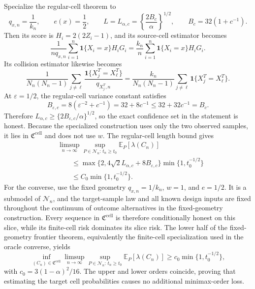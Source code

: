 Specialize the regular-cell theorem to
\[
 q_{x,n}=\frac1{k_n},
 \qquad e(x)=\frac12,
 \qquad
 L=L_{\alpha,c}=\left\{\frac{2B_c}{\alpha}\right\}^{1/2},
 \qquad B_c=32(1+c^{-1}).
\]
Then its score is \(H_i=2(2Z_i-1)\), and its source-cell estimator becomes
\[
 \frac1{nq_{x,n}}\sum_{i=1}^n\mathbf 1\{X_i=x\}H_iG_i
 =\frac{k_n}{n}\sum_{i=1}^n\mathbf 1\{X_i=x\}H_iG_i.
\]
Its collision estimator likewise becomes
\[
 \frac1{N_n(N_n-1)}\sum_{j\ne\ell}
 \frac{\mathbf 1\{X_j^T=X_\ell^T\}}{q_{X_j^T,n}}
 =\frac{k_n}{N_n(N_n-1)}\sum_{j\ne\ell}
 \mathbf 1\{X_j^T=X_\ell^T\}.
\]
At \(\varepsilon=1/2\), the regular-cell variance constant satisfies
\[
 B_{\varepsilon,c}=8(\varepsilon^{-2}+c^{-1})
 =32+8c^{-1}
 \le32+32c^{-1}=B_c.
\]
Therefore \(L_{\alpha,c}\ge\{2B_{\varepsilon,c}/\alpha\}^{1/2}\), so the exact confidence set in the statement is honest. Because the specialized construction uses only the two observed samples, it lies in \(\mathfrak C^{\mathrm{cell}}\) and does not use \(w\). The regular-cell length bound gives
\[
 \begin{aligned}
 &\limsup_{n\to\infty}
 \sup_{P\in\mathcal N_n:\,t_n\ge t_0}
 \mathbb E_P[\lambda(C_n)]\\
 &\qquad\le
 \max\{2,4\sqrt2L_{\alpha,c}+8B_{\varepsilon,c}\}
 \min\{1,t_0^{-1/2}\}\\
 &\qquad\le C_0\min\{1,t_0^{-1/2}\}.
 \end{aligned}
\]
For the converse, use the fixed geometry \(q_{x,n}=1/k_n\), \(w=1\), and \(e=1/2\). It is a submodel of \(\mathcal N_n\), and the target-sample law and all known design inputs are fixed throughout the continuum of outcome alternatives in the fixed-geometry construction. Every sequence in \(\mathfrak C^{\mathrm{cell}}\) is therefore conditionally honest on this slice, while its finite-cell risk dominates its slice risk. The lower half of the fixed-geometry frontier theorem, equivalently the finite-cell specialization used in the oracle converse, yields
\[
 \inf_{(C_n)\in\mathfrak C^{\mathrm{cell}}}
 \limsup_{n\to\infty}
 \sup_{P\in\mathcal N_n:\,t_n\ge t_0}
 \mathbb E_P[\lambda(C_n)]
 \ge c_0\min\{1,t_0^{-1/2}\},
\]
with \(c_0=3(1-\alpha)^2/16\). The upper and lower orders coincide, proving that estimating the target cell probabilities causes no additional minimax-order loss.